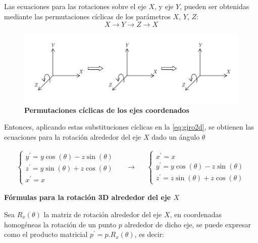 Las ecuaciones para las rotaciones sobre el eje $X$, y eje $Y$, pueden ser obtenidas mediante las permutaciones cíclicas de los parámetros $X$, $Y$, $Z$: 
$$X \xrightarrow \ Y \xrightarrow \ Z \xrightarrow \ X$$


\begin{figure}[h]
\includegraphics[width=12cm]{Img/GEO/geo-tras0.jpg}
\centering
    \caption{\footnotesize{\textbf{Permutaciones cíclicas de los ejes coordenados}}}
\end{figure}



Entonces, aplicando estas substituciones cíclicas en la \ref{eq:giro2d}, se obtienen las ecuaciones para la rotación alrededor del eje $X$ dado un ángulo
$\theta$


\begin{equation}\label{eq:giro2d1}
  \begin{split}
   \begin{cases}
{y}^{\prime} = y \cos(\theta) -z \sin(\theta) \\ 
{z}^{\prime} = y \sin(\theta) +z \cos(\theta) \\
{x}^{\prime} = x
\end{cases}
  \end{split}
\quad\longrightarrow\quad
  \begin{split}
   \begin{cases}
{x}^{\prime} = x \\ 
{y}^{\prime} = y \cos(\theta) -z \sin(\theta) \\
{z}^{\prime} = z \sin(\theta) +z \cos(\theta)
\end{cases}
\end{split}
\end{equation}

\begin{center}
\textbf{\footnotesize{Fórmulas para la rotación 3D alrededor del eje $X$}}
\end{center}
    
Sea $R_{x}( \theta )$ la matriz de rotación alrededor del eje $X$, en coordenadas homogéneas la
rotación de un punto $p$ alrededor de dicho eje, se puede expresar como el producto matricial $p^{\prime} = p.R_{x}(\theta)$, es decir:

